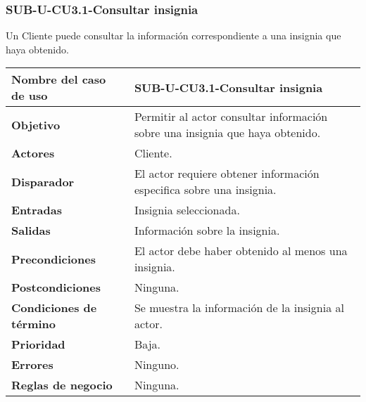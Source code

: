 \subsubsection{SUB-U-CU3.1-Consultar insignia}\label{SUB-U-CU3.1}
Un Cliente puede consultar la información correspondiente a una insignia que haya obtenido.

\begin{longtable}{|J{5cm}|J{10.3cm}|}
	\hline
	\textbf{Nombre del caso de uso} &
		SUB-U-CU3.1-Consultar insignia \\ \hline
	\textbf{Objetivo} &
		Permitir al actor consultar información sobre una insignia que haya obtenido. \\ \hline
	\textbf{Actores} &
		Cliente. \\ \hline 
	\textbf{Disparador} & 
		El actor requiere obtener información especifica sobre una insignia.\\ \hline 
	\textbf{Entradas} & Insignia seleccionada.
		\\ \hline 
	\textbf{Salidas} & Información sobre la insignia.
		\\ \hline
	\textbf{Precondiciones} &
		El actor debe haber obtenido al menos una insignia.\\ \hline
	\textbf{Postcondiciones} & Ninguna.
		\\ \hline
	\textbf{Condiciones de término} & Se muestra la información de la insignia al actor.
		\\ \hline 
	\textbf{Prioridad} & 
		Baja. \\ \hline
	\textbf{Errores} & Ninguno.
		\\ \hline
	\textbf{Reglas de negocio} & Ninguna.
		 \\ \hline
\end{longtable}

